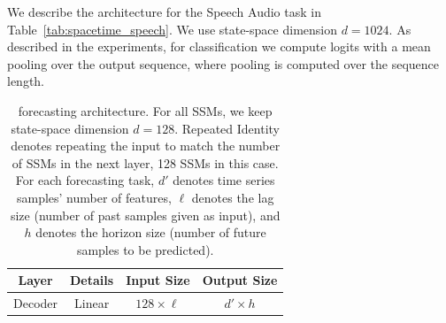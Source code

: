 We describe the architecture for the Speech Audio task in Table~\ref{tab:spacetime_speech}. We use state-space dimension $d = 1024$. As described in the experiments, for classification we compute logits with a mean pooling over the output sequence, where pooling is computed over the sequence length. 


\begin{table}[]
\centering
\caption{\ourmethod{} forecasting architecture. For all SSMs, we keep state-space dimension $d = 128$. Repeated Identity denotes repeating the input to match the number of SSMs in the next layer, \ie{} 128 SSMs in this case. For each forecasting task, $d'$ denotes time series samples' number of features, $\ell$ denotes the lag size (number of past samples given as input), and $h$ denotes the horizon size (number of future samples to be predicted).}
\label{tab:spacetime_forecasting_arch}
\begin{tabular}{@{}c|c|c|c@{}}
Layer                             & Details                                                                                                                                                                                                                                                                                                                                                                                                                                                                                     & Input Size        & Output Size       \\ \midrule
\multicolumn{1}{c|}{Decoder}     & Linear                                                                                                                                                                                                                                                                                                                                                                                                                                                                                     & $128 \times \ell$ &  $d' \times h$   \\ \midrule

\end{tabular}
\end{table}
